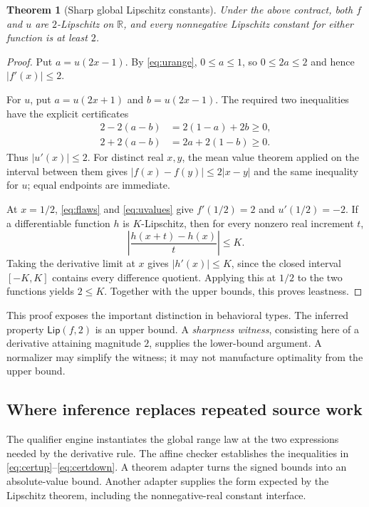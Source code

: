 \documentclass[11pt,a4paper]{article}
\newtheorem{theorem}{Theorem}[section]
\theoremstyle{definition}
\theoremstyle{remark}
\newcommand{\R}{\mathbb R}
\newcommand{\Lip}{\mathsf{Lip}}
\begin{document}
\begin{theorem}[Sharp global Lipschitz constants]
\label{thm:sharp}
Under the above contract, both $f$ and $u$ are $2$-Lipschitz on $\R$, and every nonnegative Lipschitz constant for either function is at least $2$.
\end{theorem}
\begin{proof}
Put $a=u(2x-1)$. By \eqref{eq:urange}, $0\le a\le1$, so $0\le2a\le2$ and hence $|f'(x)|\le2$.

For $u$, put $a=u(2x+1)$ and $b=u(2x-1)$. The required two inequalities have the explicit certificates
\begin{align}
 2-2(a-b)&=2(1-a)+2b\ge0,\label{eq:certup}\\
 2+2(a-b)&=2a+2(1-b)\ge0.\label{eq:certdown}
\end{align}
Thus $|u'(x)|\le2$. For distinct real $x,y$, the mean value theorem applied on the interval between them gives $|f(x)-f(y)|\le2|x-y|$ and the same inequality for $u$; equal endpoints are immediate.

At $x=1/2$, \eqref{eq:flaws} and \eqref{eq:uvalues} give $f'(1/2)=2$ and $u'(1/2)=-2$. If a differentiable function $h$ is $K$-Lipschitz, then for every nonzero real increment $t$,
\[
 \left|\frac{h(x+t)-h(x)}{t}\right|\le K.
\]
Taking the derivative limit at $x$ gives $|h'(x)|\le K$, since the closed interval $[-K,K]$ contains every difference quotient. Applying this at $1/2$ to the two functions yields $2\le K$. Together with the upper bounds, this proves leastness.
\end{proof}

This proof exposes the important distinction in behavioral types. The inferred property $\Lip(f,2)$ is an upper bound. A \emph{sharpness witness}, consisting here of a derivative attaining magnitude $2$, supplies the lower-bound argument. A normalizer may simplify the witness; it may not manufacture optimality from the upper bound.

\subsection{Where inference replaces repeated source work}
The qualifier engine instantiates the global range law at the two expressions needed by the derivative rule. The affine checker establishes the inequalities in \eqref{eq:certup}--\eqref{eq:certdown}. A theorem adapter turns the signed bounds into an absolute-value bound. Another adapter supplies the form expected by the Lipschitz theorem, including the nonnegative-real constant interface.
\end{document}
